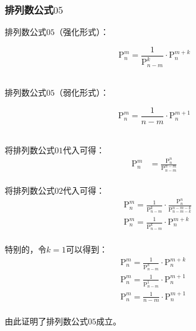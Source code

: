 \documentclass[UTF8]{ctexart}
\newcommand{\Pe}{\mathrm{P}}
\begin{document}
\subsubsection{排列数公式$05$}
    排列数公式$05$（强化形式）：
    \begin{large}
        \begin{equation*}
            \Pe_n^m=\frac{1}{\Pe_{n-m}^k}\cdot\Pe_{n}^{m+k}
        \end{equation*}
    \end{large}\\
    排列数公式$05$（弱化形式）：
    \begin{large}
        \begin{equation*}
            \Pe_n^m=\frac{1}{n-m}\cdot\Pe_{n}^{m+1}
        \end{equation*}
    \end{large}\\
    将排列数公式$01$代入可得：
    \setcounter{equation}{0}
    \begin{align}
        \Pe_n^m&=\frac{\Pe_n^n}{\Pe_{n-m}^{n-m}}
    \end{align}\\
    将排列数公式$02$代入可得：
    \begin{align}
        &\Pe_n^m=\frac{1}{\Pe_{n-m}^k}\cdot\frac{\Pe_{n}^{n}}{\Pe_{n-m-k}^{n-m-k}}\\[3mm]
        &\Pe_n^m=\frac{1}{\Pe_{n-m}^k}\cdot\Pe_{n}^{m+k}
    \end{align}\\
    特别的，令$k=1$可以得到：
    \begin{align}
        &\Pe_n^m=\frac{1}{\Pe_{n-m}^k}\cdot\Pe_{n}^{m+k}~~~~~\\[3mm]
        &\Pe_n^m=\frac{1}{\Pe_{n-m}^1}\cdot\Pe_{n}^{m+1}\\[3mm]
        &\Pe_n^m=\frac{1}{n-m}\cdot\Pe_{n}^{m+1}
    \end{align}\\
    由此证明了排列数公式$05$成立。

\newpage
\end{document}
